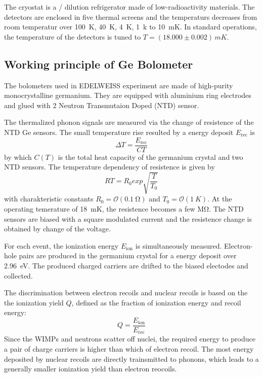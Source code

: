   The cryostat is a / dilution refrigerator made of low-radioactivity materials. The detectors are enclosed in five thermal screens and the temperaturs decreases from room temperatur over \SI{100}{K}, \SI{40}{K}, \SI{4}{K}, \SI{1}{k} to \SI{10}{mK}. In standard operations, the temperature of the detectors is tuned to $T=(18.000 \pm 0.002)\,\si{mK}$.

\subsection{Working principle of Ge Bolometer}
  \label{edw-ge}
  The bolometers used in EDELWEISS experiment are made of high-purity monocrystalline germanium. They are equipped with aluminium ring electrodes and glued with 2 Neutron Transmutaion Doped (NTD) sensor.

  The thermalized phonon signals are measured via the change of resistence of the NTD Ge sensors. The small temperature rise resulted by a energy deposit $E_{\mathrm{rec}}$ is
  \begin{equation}
      \Delta T = \frac{E_{\mathrm{rec}}}{C{T}}
  \end{equation}
  by which $C(T)$ is the total heat capacity of the germanium crystal and two NTD sensors. The temperature dependency of resistence is given by
  \begin{equation}
    R{T}=R_{0}exp\sqrt{\frac{T}{T_{0}}}
  \end{equation}
  with charakteristic constants $R_{0}=\mathcal{O}(\SI{0.1}{\ohm})$ and $T_{0}=\mathcal{O}(\SI{1}{K})$. At the operating temerature of \SI{18}{mK}, the resistence becomes a few \si{\mega\ohm}. The NTD sensors are biased with a square modulated current and the resistence change is obtained by change of the voltage.%

  For each event, the ionization energy $E_{\mathrm{ion}}$ is simultaneously measured. Electron-hole pairs are produced in the germanium crystal for a energy deposit over \SI{2.96}{eV}.%
  The produced charged carriers are drifted to the biased electodes and collected.

  The discrimination between electron recoils and nuclear recoils is based on the the ionization yield $Q$, defined as the fraction of ionization energy and recoil energy:
  \begin{equation}
    Q=\frac{E_{\mathrm{ion}}}{E_{\mathrm{rec}}}
  \end{equation}
  Since the WIMPs and neutrons scatter off nuclei, the required energy to produce a pair of charge carriers is higher than which of electron recoil. The most energy deposited by nuclear recoils are directly trainsmitted to phonons, which leads to a generally smaller ionization yield than electron reocoils.

